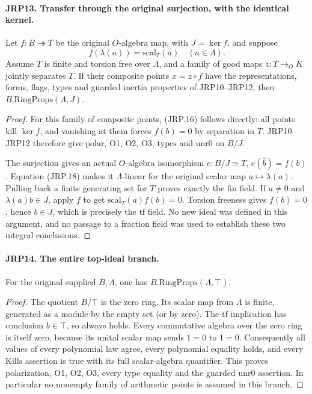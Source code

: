\documentclass[11pt,a4paper]{article}
\numberwithin{equation}{section}
\theoremstyle{remark}\newtheorem{remark}[theorem]{Remark}
\begin{document}
\paragraph{JRP13. Transfer through the original surjection, with the identical kernel.}
\label{claim:JRP13}
Let \(f:B\twoheadrightarrow T\) be the original
\(O\)-algebra map, with \(J=\ker f\), and suppose
\[
                   f(\lambda(a))=\mathrm{scal}_T(a)
                                  \quad(a\in\Lambda).
 \tag{JRP.18}
\]
Assume \(T\) is finite and torsion free over \(\Lambda\),
and a family of good maps \(z:T\to_O K\) jointly separates
\(T\).  If their composite points \(x=z\circ f\) have the
representations, forms, flags, types and guarded inertia properties
of JRP10--JRP12, then \(B.\mathrm{RingProps}(\Lambda,J)\).
\begin{proof}
For this family of composite points, (JRP.16) follows directly:
all points kill \(\ker f\), and vanishing at them forces
\(f(b)=0\) by separation in \(T\).  JRP10--JRP12 therefore
give \(\mathrm{polar}\), O1, O2, O3,
\(\mathrm{types}\) and \(\mathrm{unr0}\) on \(B/J\).

The surjection gives an actual \(O\)-algebra isomorphism
\(e:B/J\simeq T\), \(e(\bar b)=f(b)\).
Equation (JRP.18) makes it \(\Lambda\)-linear for the
original scalar map \(a\mapsto\overline{\lambda(a)}\).
Pulling back a finite generating set for \(T\) proves exactly
the \(\mathrm{fin}\) field.  If \(a\ne0\) and
\(\lambda(a)b\in J\), apply \(f\) to get
\(\mathrm{scal}_T(a)f(b)=0\).  Torsion freeness gives
\(f(b)=0\), hence \(b\in J\), which is precisely
the \(\mathrm{tf}\) field.  No new ideal was defined in this
argument, and no passage to a fraction field was used to establish
these two integral conclusions.
\end{proof}

\paragraph{JRP14. The entire top-ideal branch.}
\label{claim:JRP14}
\leavevmode\par
For the original supplied \(B,\Lambda\), one has
\(B.\mathrm{RingProps}(\Lambda,\top)\).
\begin{proof}
The quotient \(B/\top\) is the zero ring.  Its scalar map from
\(\Lambda\) is finite, generated as a module by the empty set
(or by zero).  The \(\mathrm{tf}\) implication has conclusion
\(b\in\top\), so always holds.  Every commutative algebra over
the zero ring is itself zero, because its unital scalar map sends
\(1=0\) to \(1=0\).  Consequently all values of every
polynomial law agree, every polynomial equality holds, and every
\(\mathrm{Kills}\) assertion is true with its full scalar-algebra
quantifier.  This proves polarization, O1, O2, O3, every type
equality and the guarded \(\mathrm{unr0}\) assertion.  In
particular no nonempty family of arithmetic points is assumed in
this branch.
\end{proof}
\end{document}
